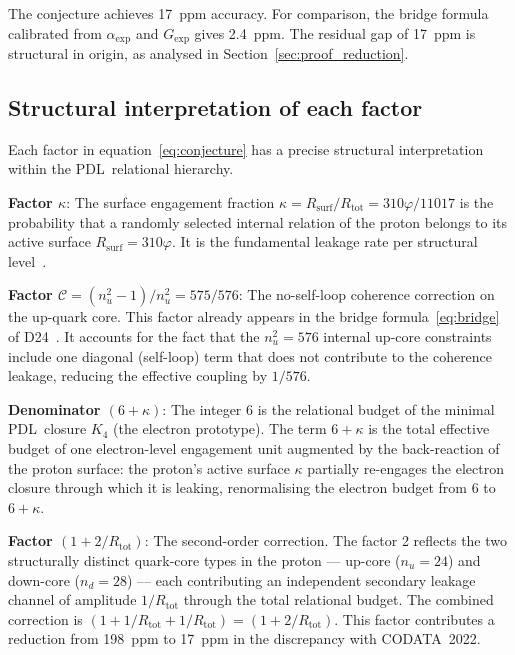\documentclass[11pt,a4paper]{article}
\theoremstyle{definition}
\newcommand{\PDL}{\textnormal{PDL}}
\newcommand{\Rsurf}{R_{\mathrm{surf}}}
\newcommand{\Rtot}{R_{\mathrm{tot}}}
\newcommand{\Kfour}{K_4}
\newcommand{\calC}{\mathcal{C}}
\newcommand{\vp}{\varphi}
\newcommand{\kap}{\kappa}
\begin{document}
The conjecture achieves 17~ppm accuracy. For comparison, the bridge formula calibrated from $\alpha_{\exp}$ and $G_{\exp}$ gives 2.4~ppm. The residual gap of 17~ppm is structural in origin, as analysed in Section~\ref{sec:proof_reduction}.

\subsection{Structural interpretation of each factor}
\label{subsec:interpretation}

Each factor in equation~\eqref{eq:conjecture} has a precise structural interpretation within the \PDL\ relational hierarchy.

\medskip\noindent\textbf{Factor $\kap$}: The surface engagement fraction $\kap = \Rsurf/\Rtot = 310\vp/11017$ is the probability that a randomly selected internal relation of the proton belongs to its active surface $\Rsurf = 310\vp$. It is the fundamental leakage rate per structural level~\cite{Hubble_Resolution_PDL_2026}.

\medskip\noindent\textbf{Factor $\calC = (n_u^2-1)/n_u^2 = 575/576$}: The no-self-loop coherence correction on the up-quark core. This factor already appears in the bridge formula~\eqref{eq:bridge} of D24~\cite{Bridge_PDL_2026}. It accounts for the fact that the $n_u^2 = 576$ internal up-core constraints include one diagonal (self-loop) term that does not contribute to the coherence leakage, reducing the effective coupling by $1/576$.

\medskip\noindent\textbf{Denominator $(6+\kap)$}: The integer 6 is the relational budget of the minimal \PDL\ closure $\Kfour$ (the electron prototype). The term $6+\kap$ is the total effective budget of one electron-level engagement unit augmented by the back-reaction of the proton surface: the proton's active surface $\kap$ partially re-engages the electron closure through which it is leaking, renormalising the electron budget from 6 to $6+\kap$.

\medskip\noindent\textbf{Factor $(1+2/\Rtot)$}: The second-order correction. The factor 2 reflects the two structurally distinct quark-core types in the proton --- up-core ($n_u = 24$) and down-core ($n_d = 28$) --- each contributing an independent secondary leakage channel of amplitude $1/\Rtot$ through the total relational budget. The combined correction is $(1 + 1/\Rtot + 1/\Rtot) = (1 + 2/\Rtot)$. This factor contributes a reduction from 198~ppm to 17~ppm in the discrepancy with CODATA~2022.
\end{document}
